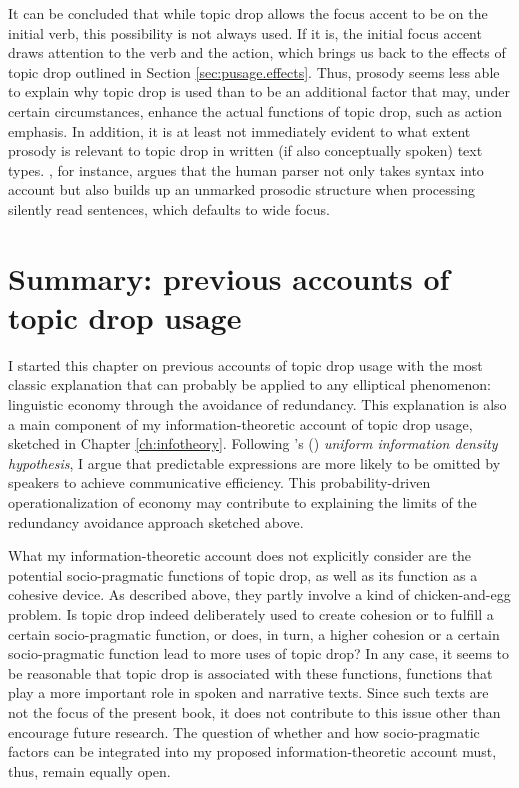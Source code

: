 It can be concluded that while topic drop allows the focus  accent to be on the initial verb, this possibility is not always used.
If it is, the initial focus  accent draws attention to the verb and the action, which brings us back to the effects of topic drop outlined in Section \ref{sec:pusage.effects}.
Thus, prosody seems less able to explain why topic drop is used than to be an additional factor that may, under certain circumstances, enhance the actual functions of topic drop, such as action emphasis.
In addition, it is at least not immediately evident to what extent prosody is relevant to topic drop in written (if also conceptually spoken) text types. 
\citet{fery2006}, for instance, argues that the human parser  not only takes syntax into account but also builds up an unmarked prosodic structure when processing silently read sentences, which defaults to wide focus. 

\section{Summary: previous accounts of topic drop usage} 
I started this chapter on previous accounts of topic drop usage with the most classic explanation that can probably be applied to any elliptical phenomenon:
linguistic economy through the avoidance of redundancy.
This explanation is also a main component of my information-theoretic  account of topic drop usage, sketched in Chapter \ref{ch:infotheory}.
Following \citeauthor{levy.jaeger2007}'s (\citeyear{levy.jaeger2007}) \textit{uniform information density hypothesis},  I argue that predictable  expressions are more likely to be omitted by speakers to achieve communicative efficiency.
This probability-driven operationalization of economy may contribute to explaining the limits of the redundancy avoidance approach sketched above.

What my information-theoretic account does not explicitly consider are the potential socio-pragmatic functions of topic drop, as well as its function as a cohesive device.
As described above, they partly involve a kind of chicken-and-egg problem.
Is topic drop indeed deliberately used to create cohesion or to fulfill a certain socio-pragmatic function, or does, in turn, a higher cohesion or a certain socio-pragmatic function lead to more uses of topic drop?
In any case, it seems to be reasonable that topic drop is associated with these functions, functions that play a more important role in spoken and narrative texts.
Since such texts are not the focus of the present book, it does not contribute to this issue other than encourage future research.
The question of whether and how socio-pragmatic factors can be integrated into my proposed information-theoretic account must, thus, remain equally open.

